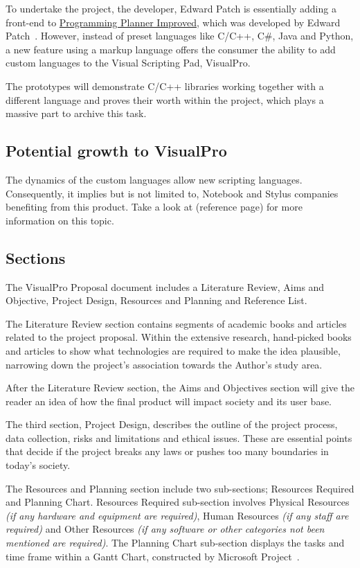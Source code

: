 \documentclass[conference]{IEEEtran}
\begin{document}
      To undertake the project, the developer, Edward Patch is essentially adding a front-end to \href{https://github.com/ShinkuKira21/VisualPro-FinalProject/tree/main/Experience/Programmer%20Planner%20Improved}{Programming Planner Improved}, which was developed by Edward Patch~\cite{patch_programming_2021}. However, instead of preset languages like C/C++, C\#, Java and Python, a new feature using a markup language offers the consumer the ability to add custom languages to the Visual Scripting Pad, VisualPro.

      The prototypes will demonstrate C/C++ libraries working together with a different language and proves their worth within the project, which plays a massive part to archive this task.

      \subsection{Potential growth to VisualPro}
      The dynamics of the custom languages allow new scripting languages. Consequently, it implies but is not limited to, Notebook and Stylus companies benefiting from this product. Take a look at (reference page) for more information on this topic.

      \subsection{Sections}
      The VisualPro Proposal document includes a Literature Review, Aims and Objective, Project Design, Resources and Planning and Reference List.

      The Literature Review section contains segments of academic books and articles related to the project proposal. Within the extensive research, hand-picked books and articles to show what technologies are required to make the idea plausible, narrowing down the project's association towards the Author's study area.
      
      After the Literature Review section, the Aims and Objectives section will give the reader an idea of how the final product will impact society and its user base.
      
      The third section, Project Design, describes the outline of the project process, data collection, risks and limitations and ethical issues. These are essential points that decide if the project breaks any laws or pushes too many boundaries in today's society.
      
      The Resources and Planning section include two sub-sections; Resources Required and Planning Chart. Resources Required sub-section involves Physical Resources \textit{(if any hardware and equipment are required)}, Human Resources \textit{(if any staff are required)} and Other Resources \textit{(if any software or other categories not been mentioned are required)}. The Planning Chart sub-section displays the tasks and time frame within a Gantt Chart, constructed by Microsoft Project~\cite{microsoft_compare_nodate}.
\end{document}
